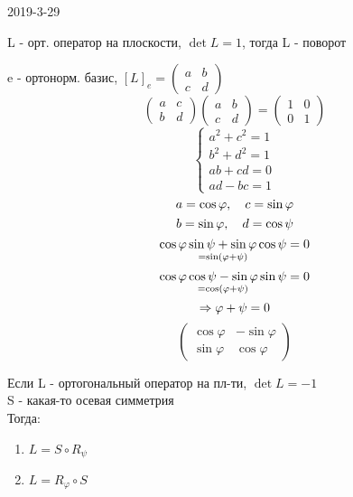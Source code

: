 \documentclass[main]{subfiles}
\begin{document}
  \begin{lect}{2019-3-29}
    \begin{definition}
      L - орт. оператор на плоскости, $\det L = 1$, тогда L - поворот
    \end{definition}

    e - ортонорм. базис, $[L]_e = \begin{pmatrix}
      a & b\\
      c & d
    \end{pmatrix}$
    \[\begin{pmatrix}
      a & c\\
      b & d
    \end{pmatrix} \begin{pmatrix}
      a & b\\
      c & d
    \end{pmatrix} = \begin{pmatrix}
      1 & 0\\
      0 & 1
    \end{pmatrix}\]
    \[\begin{cases}
      a^2 + c^2 = 1\\
      b^2 + d^2 = 1\\
      ab + cd = 0\\
      ad - bc = 1
    \end{cases}\]
    \[a = \cos \varphi,\quad c = \sin \varphi\]
    \[b = \sin \varphi,\quad d = \cos \psi\]
    \[\underset{= \sin(\varphi + \psi)}{\cos \varphi \sin \psi + \sin \varphi \cos \psi} = 0\]
    \[\underset{= \cos(\varphi + \psi)}{\cos \varphi \cos \psi - \sin \varphi \sin \psi} = 0\]
    \[\Rightarrow \varphi + \psi = 0\]
    \[\begin{pmatrix}
      \cos \varphi & - \sin \varphi\\
      \sin \varphi & \cos \varphi
    \end{pmatrix}\]

    \begin{definition}
      Если L - ортогональный оператор на пл-ти, $\det L = -1$\\
      S - какая-то осевая симметрия\\
      Тогда:
      \begin{enumerate}
        \item $L = S \circ R_{\psi}$
        \item $L = R_{\varphi} \circ S$
      \end{enumerate}
    \end{definition}


\end{lect}
\end{document}
